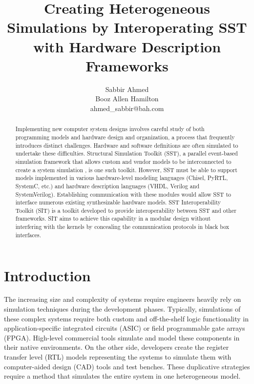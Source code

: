 \documentclass{article}
\title{Creating Heterogeneous Simulations by Interoperating SST with Hardware Description Frameworks}
\author{
  Sabbir Ahmed \\
  Booz Allen Hamilton \\
  ahmed\_sabbir@bah.com
}
\begin{document}
  \maketitle

  \begin{abstract}
    Implementing new computer system designs involves careful study of both programming models and
    hardware design and organization, a process that frequently introduces distinct challenges.
    Hardware and software definitions are often simulated to undertake these difficulties.
    Structural Simulation Toolkit (SST), a parallel event-based simulation framework that allows
    custom and vendor models to be interconnected to create a system simulation \cite{sst}, is one
    such toolkit. However, SST must be able to support models implemented in various hardware-level
    modeling languages (Chisel, PyRTL, SystemC, etc.) and hardware description languages (VHDL,
    Verilog and SystemVerilog). Establishing communication with these modules would allow SST to
    interface numerous existing synthesizable hardware models. SST Interoperability Toolkit (SIT) is
    a toolkit developed to provide interoperability between SST and other frameworks. SIT aims to
    achieve this capability in a modular design without interfering with the kernels by concealing
    the communication protocols in black box interfaces.
  \end{abstract}

  \section{Introduction}  
  The increasing size and complexity of systems require engineers heavily rely on simulation
  techniques during the development phases. Typically, simulations of these complex systems require
  both custom and off-the-shelf logic functionality in application-specific integrated circuits
  (ASIC) or field programmable gate arrays (FPGA). High-level commercial tools simulate and model
  these components in their native environments. On the other side, developers create the register
  transfer level (RTL) models representing the systems to simulate them with computer-aided design
  (CAD) tools and test benches. These duplicative strategies require a method that simulates the
  entire system in one heterogeneous model.
\end{document}
